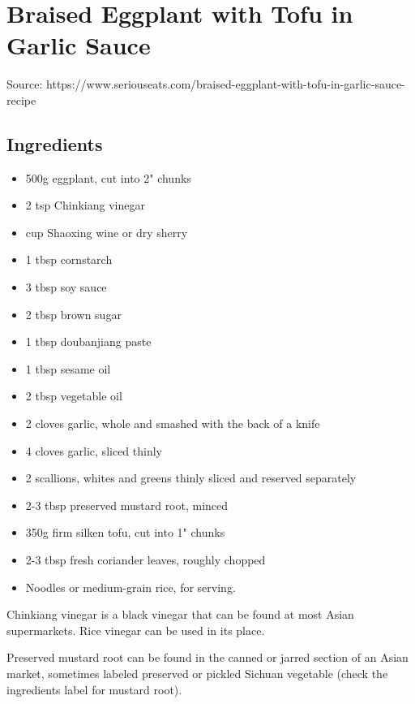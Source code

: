 \section{Braised Eggplant with Tofu in Garlic Sauce}


Source: https://www.seriouseats.com/braised-eggplant-with-tofu-in-garlic-sauce-recipe

\subsection{Ingredients}

\begin{itemize}
    \item 500g eggplant, cut into 2" chunks
    \item 2 tsp Chinkiang vinegar
    \item {} cup Shaoxing wine or dry sherry
    \item 1 tbsp cornstarch
    \item 3 tbsp soy sauce
    \item 2 tbsp brown sugar
    \item 1 tbsp doubanjiang paste
    \item 1 tbsp sesame oil
    \item 2 tbsp vegetable oil
    \item 2 cloves garlic, whole and smashed with the back of a knife
    \item 4 cloves garlic, sliced thinly
    \item 2 scallions, whites and greens thinly sliced and reserved separately
    \item 2-3 tbsp preserved mustard root, minced
    \item 350g firm silken tofu, cut into 1" chunks
    \item 2-3 tbsp fresh coriander leaves, roughly chopped
    \item Noodles or medium-grain rice, for serving.
\end{itemize}

Chinkiang vinegar is a black vinegar that can be found at most Asian supermarkets. Rice vinegar can be used in its place.

Preserved mustard root can be found in the canned or jarred section of an Asian market, sometimes labeled preserved or pickled Sichuan vegetable (check the ingredients label for mustard root).

